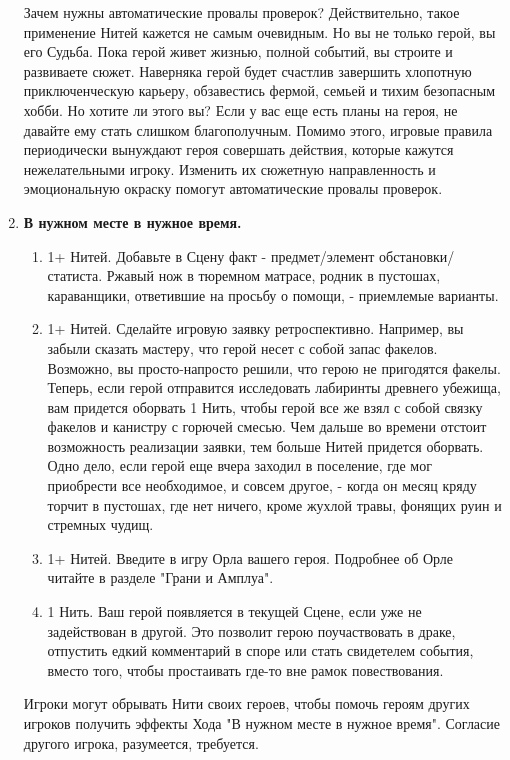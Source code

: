 \begin{enumerate}
    \begin{tcolorbox}
        Зачем нужны автоматические провалы проверок? Действительно, такое применение Нитей кажется не самым очевидным. Но вы не только герой, вы его Судьба. Пока герой живет жизнью, полной событий, вы строите и развиваете сюжет. Наверняка герой будет счастлив завершить хлопотную приключенческую карьеру, обзавестись фермой, семьей и тихим безопасным хобби. Но хотите ли этого вы? Если у вас еще есть планы на героя, не давайте ему стать слишком благополучным.
        \newline Помимо этого, игровые правила периодически вынуждают героя совершать действия, которые кажутся нежелательными игроку. Изменить их сюжетную направленность и эмоциональную окраску помогут автоматические провалы проверок.
    \end{tcolorbox}

    \item \textbf{В нужном месте в нужное время.}
    \begin{enumerate}
        \item 1+ Нитей. Добавьте в Сцену факт - предмет/элемент обстановки/статиста. Ржавый нож в тюремном матрасе, родник в пустошах, караванщики, ответившие на просьбу о помощи, - приемлемые варианты. 
        \item 1+ Нитей. Сделайте игровую заявку ретроспективно. Например, вы забыли сказать мастеру, что герой несет с собой запас факелов. Возможно, вы просто-напросто решили, что герою не пригодятся факелы. Теперь, если герой отправится исследовать лабиринты древнего убежища, вам придется оборвать 1 Нить, чтобы герой все же взял с собой связку факелов и канистру с горючей смесью.
        \newline Чем дальше во времени отстоит возможность реализации заявки, тем больше Нитей придется оборвать. Одно дело, если герой еще вчера заходил в поселение, где мог приобрести все необходимое, и совсем другое, - когда он месяц кряду торчит в пустошах, где нет ничего, кроме жухлой травы, фонящих руин и стремных чудищ.
        \item 1+ Нитей. Введите в игру Орла вашего героя. Подробнее об Орле читайте в разделе "Грани и Амплуа".
        \item 1 Нить. Ваш герой появляется в текущей Сцене, если уже не задействован в другой. Это позволит герою поучаствовать в драке, отпустить едкий комментарий в споре или стать свидетелем события, вместо того, чтобы простаивать где-то вне рамок повествования.
    \end{enumerate}
    \begin{tcolorbox}
        Игроки могут обрывать Нити своих героев, чтобы помочь героям других игроков получить эффекты Хода "В нужном месте в нужное время". Согласие другого игрока, разумеется, требуется.
    \end{tcolorbox}


\end{enumerate}
